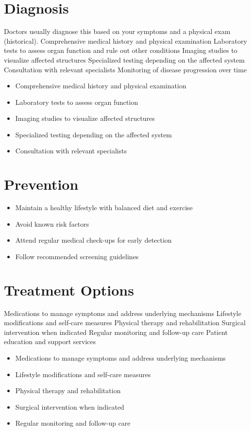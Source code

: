 \section{Diagnosis}
Doctors usually diagnose this based on your symptoms and a physical exam (historical). Comprehensive medical history and physical examination Laboratory tests to assess organ function and rule out other conditions Imaging studies to visualize affected structures Specialized testing depending on the affected system Consultation with relevant specialists Monitoring of disease progression over time

\begin{itemize}[noitemsep]
  \item Comprehensive medical history and physical examination
  \item Laboratory tests to assess organ function
  \item Imaging studies to visualize affected structures
  \item Specialized testing depending on the affected system
  \item Consultation with relevant specialists
\end{itemize}
\section{Prevention}
\begin{itemize}[noitemsep]
  \item Maintain a healthy lifestyle with balanced diet and exercise
  \item Avoid known risk factors
  \item Attend regular medical check-ups for early detection
  \item Follow recommended screening guidelines
\end{itemize}
\section{Treatment Options}
Medications to manage symptoms and address underlying mechanisms Lifestyle modifications and self-care measures Physical therapy and rehabilitation Surgical intervention when indicated Regular monitoring and follow-up care Patient education and support services

\begin{itemize}[noitemsep]
  \item Medications to manage symptoms and address underlying mechanisms
  \item Lifestyle modifications and self-care measures
  \item Physical therapy and rehabilitation
  \item Surgical intervention when indicated
  \item Regular monitoring and follow-up care
\end{itemize}

